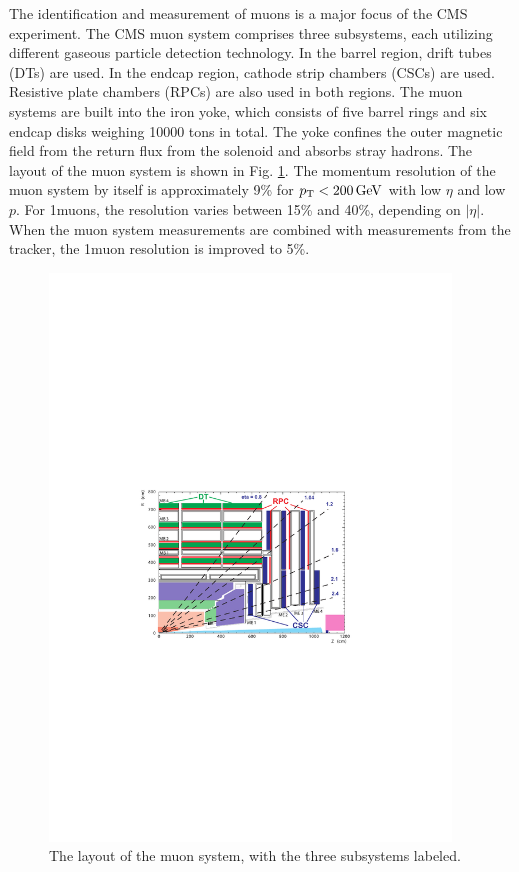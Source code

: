 The identification and measurement of muons is a major focus of the CMS experiment. The CMS muon system comprises three subsystems, each utilizing different gaseous particle detection technology. In the barrel region, drift tubes (DTs) are used. In the endcap region, cathode strip chambers (CSCs) are used. Resistive plate chambers (RPCs) are also used in both regions. The muon systems are built into the iron yoke, which consists of five barrel rings and six endcap disks weighing 10000 tons in total. The yoke confines the outer magnetic field from the return flux from the solenoid and absorbs stray hadrons. The layout of the muon system is shown in Fig. \ref{fig:muon-system}. The momentum resolution of the muon system by itself is approximately 9\% for $p_{\mathrm{T}}<200\,\text{Ge\hspace{-.08em}V}$ with low $\eta$ and low $p$. For 1\TeV muons, the resolution varies between 15\% and 40\%, depending on $|\eta|$. When the muon system measurements are combined with measurements from the tracker, the 1\TeV muon resolution is improved to 5\%.

\begin{figure}[hbt]
\begin{center}
\includegraphics[width=0.95\textwidth]{figures/CMS_muon_system.pdf}
\caption{The layout of the muon system, with the three subsystems labeled.}
\label{fig:muon-system}
\end{center}
\end{figure}

